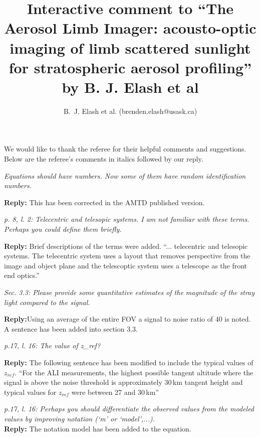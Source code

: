 \documentclass[12pt, notitlepage]{article}
\title{Interactive comment to ``The Aerosol Limb Imager: acousto-optic imaging of limb scattered
sunlight for stratospheric aerosol profiling'' by B. J. Elash et al}
\author{B.~J. Elash et al. (brenden.elash@usask.ca)}
\begin{document}
\begin{titlepage}
\maketitle
\end{titlepage}


We would like to thank the referee for their helpful comments and suggestions. Below are the referee's comments in italics followed by our reply.

\hrulefill

\textit{Equations should have numbers. Now some of them have random identification numbers.}

\textbf{Reply:} This has been corrected in the AMTD published version.

\hrulefill

\textit{p. 8, l. 2: Telecentric and telesopic systems. I am not familiar with these terms. Perhaps you could define them briefly.}

\textbf{Reply:} Brief descriptions of the terms were added. ``... telecentric and telesopic systems. The telecentric system uses a layout that removes perspective from the image and object plane and the telescoptic system uses a telescope as the front end optics.''

\hrulefill

\textit{Sec. 3.3: Please provide some quantitative estimates of the magnitude of the stray light compared to the signal.}

\textbf{Reply:}Using an average of the entire FOV a signal to noise ratio of 40 is noted. A sentence has been added into section 3.3.

\hrulefill

\textit{p.17, l. 16: The value of z\_ref?}

\textbf{Reply:} The following sentence has been modified to include the typical values of $z_{ref}$. ``For the ALI measurements, the highest
possible tangent altitude where the signal is above the noise threshold is
approximately 30\,km tangent height and typical values for $z_{ref}$ were between 27 and 30\,km''

\hrulefill

\textit{p.17, l. 16: Perhaps you should differentiate the observed values from the modeled values by improving notation (`m' or `model',...).}\\

\textbf{Reply:} The notation model has been added to the equation.
\end{document}
